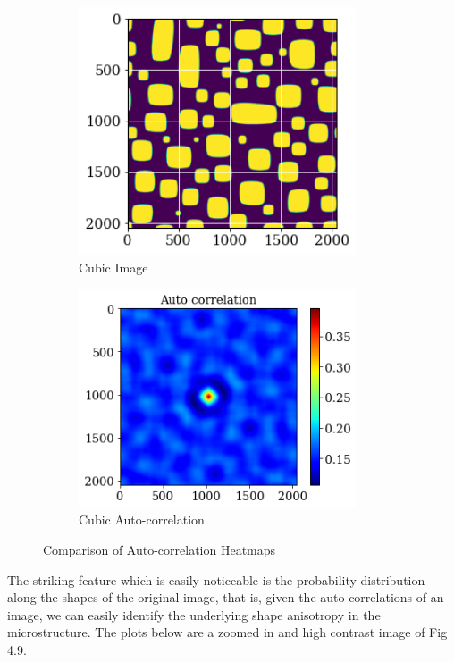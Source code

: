 \documentclass[12pt, a4paper]{report}
\begin{document}
\begin{figure}[H]
\begin{subfigure}{.45\textwidth}
  \centering
  \includegraphics[width=0.9\textwidth]{Pictures/Comparison/cub_img.png}
  \caption{Cubic Image}
  \label{img:microstrImg}
\end{subfigure}
\begin{subfigure}{.5\textwidth}
  \centering
  \includegraphics[width=0.9\textwidth]{Pictures/Comparison/cubic_heatmap.png}
  \caption{Cubic Auto-correlation}
  \label{img:microstrImg}
\end{subfigure}
\caption{Comparison of Auto-correlation Heatmaps}
\label{fig:test22}
\end{figure}

The striking feature which is easily noticeable is the probability distribution along the shapes of the original image, that is, given the auto-correlations of an image, we can easily identify the underlying shape anisotropy in the microstructure. The plots below are a zoomed in and high contrast image of Fig 4.9.
\end{document}
